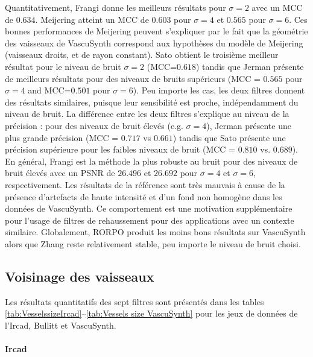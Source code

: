 Quantitativement, Frangi donne les meilleurs résultats pour $\sigma=2$ avec un MCC de $0.634$. Meijering  atteint un MCC de $0.603$ pour $\sigma=4$ et $0.565$ pour $\sigma=6$. Ces bonnes performances de Meijering peuvent s'expliquer par le fait que la géométrie des vaisseaux de VascuSynth correspond aux hypothèses du modèle de Meijering (vaisseaux droits, et de rayon constant). Sato obtient le troisième meilleur résultat pour le niveau de bruit $\sigma=2$ (MCC=$0.618$) tandis que Jerman présente de meilleurs résultats pour des niveaux de bruits supérieurs (MCC = $0.565$ pour $\sigma=4$ and MCC=$0.501$ pour $\sigma = 6$). Peu importe les cas, les deux filtres donnent des résultats similaires, puisque leur sensibilité est proche, indépendamment du niveau de bruit. La différence entre les deux filtres s'explique au niveau de la précision : pour des niveaux de bruit élevés (e.g. $\sigma=4$), Jerman présente une plus grande précision (MCC = $0.717$ vs $0.661$) tandis que Sato présente une précision supérieure pour les faibles niveaux de bruit (MCC = $0.810$ vs. $0.689$). En général, Frangi est la méthode la plus robuste au bruit pour des niveaux de bruit élevés avec un PSNR de $26.496$ et $26.692$ pour $\sigma=4$ et $\sigma=6$, respectivement. Les résultats de la référence sont très mauvais à cause de la présence d'artefacts de haute intensité et d'un fond non homogène dans les données de VascuSynth. Ce comportement est une motivation supplémentaire pour l'usage de filtres de rehaussement pour des applications avec un contexte similaire. Globalement, RORPO produit les moins bons résultats sur VascuSynth alors que Zhang reste relativement stable, peu importe le niveau de bruit choisi.

\subsection{Voisinage des vaisseaux}
Les résultats quantitatifs des sept filtres sont présentés dans les tables \ref{tab:VesselssizeIrcad}--\ref{tab:Vessels size VascuSynth} pour les jeux de données de l'Ircad, Bullitt et VascuSynth.

\paragraph{Ircad}

